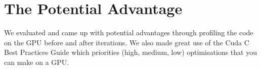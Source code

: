 \section*{The Potential Advantage}
We evaluated and came up with potential advantages through profiling the code on the GPU before and after iterations.
We also made great use of the Cuda C Best Practices Guide\cite{best_practices} which priorities (high, medium, low) optimisations that you can make on a GPU.